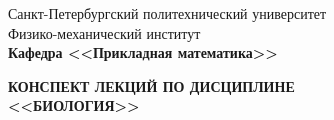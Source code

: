 \documentclass[main.tex]{subfiles}
\begin{document}
	\begin{titlepage}
		\begin{center}
			\begin{large}
				Санкт-Петербургский политехнический университет\\
				Физико-механический институт\\
				\textbf{Кафедра <<Прикладная математика>>}\\
			\end{large}
			\vfill
			\Large{\textbf{КОНСПЕКТ ЛЕКЦИЙ ПО ДИСЦИПЛИНЕ \\
					<<БИОЛОГИЯ>>}}
		\end{center}
		\vfill
		\begin{figure}[H]
		\end{figure}
		\vfill
	\end{titlepage}
\end{document}
